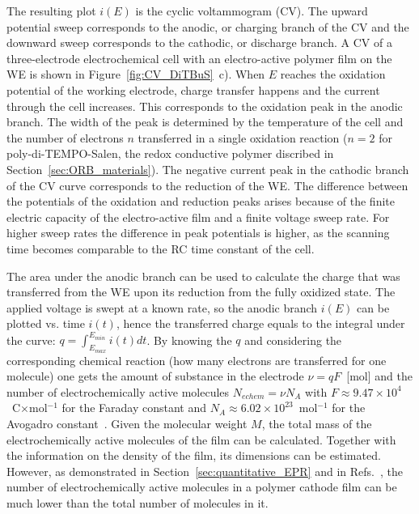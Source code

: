 \par
The resulting plot $i(E)$ is the cyclic voltammogram (CV). The upward potential sweep corresponds to the anodic, or charging branch of the CV and the downward sweep corresponds to the cathodic, or discharge branch. A CV of a three-electrode electrochemical cell with an electro-active polymer film on the WE is shown in Figure~\ref{fig:CV_DiTBuS}~c). When $E$ reaches the oxidation potential of the working electrode, charge transfer happens and the current through the cell increases. This corresponds to the oxidation peak in the anodic branch. The width of the peak is determined by the temperature of the cell and the number of electrons $n$ transferred in a single oxidation reaction ($n=2$ for poly-di-TEMPO-Salen, the redox conductive polymer discribed in Section~\ref{sec:ORB_materials}). The negative current peak in the cathodic branch of the CV curve corresponds to the reduction of the WE. The difference between the potentials of the oxidation and reduction peaks arises because of the finite electric capacity of the electro-active film and a finite voltage sweep rate. For higher sweep rates the difference in peak potentials is higher, as the scanning time becomes comparable to the RC time constant of the cell.\\


\par
The area under the anodic branch can be used to calculate the charge that was transferred from the WE upon its reduction from the fully oxidized state. The applied voltage is swept at a known rate, so the anodic branch $i(E)$ can be plotted vs. time $i(t)$, hence the transferred charge equals to the integral under the curve: $q = \int_{E_{max}}^{E_{min}}i(t)dt$. By knowing the $q$ and considering the corresponding chemical reaction (how many electrons are transferred for one molecule) one gets the amount of substance in the electrode $\nu=qF$~[mol] and the number of electrochemically active molecules $N_{echem}=\nu N_A$ with $F\approx9.47\times10^4$~C$\times$mol$^{-1}$ for the Faraday constant and $N_A\approx6.02\times10^{23}$~mol$^{-1}$ for the Avogadro constant~\cite{NIST}. Given the molecular weight $M$, the total mass of the electrochemically active molecules of the film can be calculated. Together with the information on the density of the film, its dimensions can be estimated. However, as demonstrated in Section~\ref{sec:quantitative_EPR} and in Refs.~\cite{Vereshchagin2022,Kulikov2022,Kulikov2023}, the number of electrochemically active molecules in a polymer cathode film can be much lower than the total number of molecules in it.  


